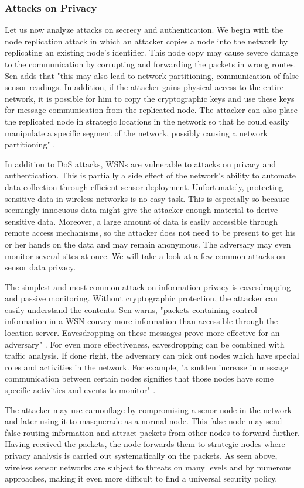 \documentclass[12pt,a4paper,twoside]{report}
\begin{document}
\subsubsection{Attacks on Privacy}
Let us now analyze attacks on secrecy and authentication. We begin with the node replication attack in which an attacker copies a node into the network by replicating an existing node's identifier. This node copy may cause severe damage to the communication by corrupting and forwarding the packets in wrong routes. Sen adds that "this may also lead to network partitioning, communication of false sensor readings. In addition, if the attacker gains physical access to the entire network, it is possible for him to copy the cryptographic keys and use these keys for message communication from the replicated node. The attacker can also place the replicated node in strategic locations in the network so that he could easily manipulate a specific segment of the network, possibly causing a network partitioning" \cite{sen:2009}.\par
In addition to DoS attacks, WSNs are vulnerable to attacks on privacy and authentication. This is partially a side effect of the network's ability to automate data collection through efficient sensor deployment. Unfortunately, protecting sensitive data in wireless networks is no easy task. This is especially so because seemingly innocuous data might give the attacker enough material to derive sensitive data. Moreover, a large amount of data is easily accessible through remote access mechanisms, so the attacker does not need to be present to get his or her hands on the data and may remain anonymous. The adversary may even monitor several sites at once.  We will take a look at a few common attacks on sensor data privacy.\par
The simplest and most common attack on information privacy is eavesdropping and passive monitoring. Without cryptographic protection, the attacker can easily understand the contents. Sen warns, "packets containing control information in a WSN convey more information than accessible through the location server. Eavesdropping on these messages prove more effective for an adversary" \cite{sen:2009}. For even more effectiveness, eavesdropping can be combined with traffic analysis. If done right, the adversary can pick out nodes which have special roles and activities in the network. For example, "a sudden increase in message communication between certain nodes signifies that those nodes have some specific activities and events to monitor" \cite{sen:2009}. \par
The attacker may use camouflage by compromising a senor node in the network and later using it to masquerade as a normal node. This false node may send false routing information and attract packets from other nodes to forward further. Having received the packets, the node forwards them to strategic nodes where privacy analysis is carried out systematically on the packets. As seen above, wireless sensor networks are subject to threats on many levels and by numerous approaches, making it even more difficult to find a universal security policy.\par
\end{document}
